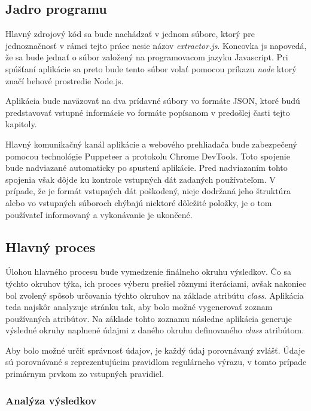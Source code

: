 \bigskip

\subsection{Jadro programu}

Hlavný zdrojový kód sa bude nachádzať v jednom súbore, ktorý pre jednoznačnosť v rámci tejto práce nesie názov \textit{extractor.js}. Koncovka js napovedá, že sa bude jednať o súbor založený na programovacom jazyku Javascript. Pri spúšťaní aplikácie sa preto bude tento súbor volať pomocou príkazu \textit{node} ktorý značí behové prostredie Node.js.

Aplikácia bude naväzovať na dva prídavné súbory vo formáte JSON, ktoré budú predstavovať vstupné informácie vo formáte popísanom v predošlej časti tejto kapitoly. 

Hlavný komunikačný kanál aplikácie a webového prehliadača bude zabezpečený pomocou technológie Puppeteer a protokolu Chrome DevTools. Toto spojenie bude nadviazané automaticky po spustení aplikácie. Pred nadviazaním tohto spojenia však dôjde ku kontrole vstupných dát zadaných používateľom. V prípade, že je formát vstupných dát poškodený, nieje dodržaná jeho štruktúra alebo vo vstupných súboroch chýbajú niektoré dôležité položky, je o tom používateľ informovaný a vykonávanie je ukončené.

\subsection{Hlavný proces}

Úlohou hlavného procesu bude vymedzenie finálneho okruhu výsledkov. Čo sa týchto okruhov týka, ich proces výberu prešiel rôznymi iteráciami, avšak nakoniec bol zvolený spôsob určovania týchto okruhov na základe atribútu \textit{class}. Aplikácia teda najskôr analyzuje stránku tak, aby bolo možné vygenerovať zoznam používaných atribútov. Na základe tohto zoznamu následne aplikácia generuje výsledné okruhy naplnené údajmi z daného okruhu definovaného \textit{class} atribútom. 

Aby bolo možné určiť správnosť údajov, je každý údaj porovnávaný zvlášť. Údaje sú porovnávané s reprezentujúcim pravidlom regulárneho výrazu, v tomto prípade primárnym prvkom zo vstupných pravidiel.


\subsubsection{Analýza výsledkov}

